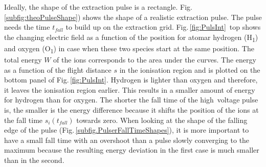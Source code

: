	Ideally, the shape of the extraction pulse is a rectangle. Fig.\,\ref{subfig:theoPulseShape}) shows the shape of a realistic extraction pulse. The pulse needs the time $t_{fall}$ to build up on the extraction grid. Fig.\,\ref{fig:PulsInt}~top shows the changing electric field as a function of the position for atomar hydrogen (H\textsubscript{1}) and oxygen (O\textsubscript{1}) in case when these two species start at the same position. The total energy $W$ of the ions corresponds to the area under the curves. The energy as a function of the flight distance $s$ in the ionisation region and is plotted on the bottom panel of Fig.\,\ref{fig:PulsInt}. Hydrogen is lighter than oxygen and therefore, it leaves the ionisation region earlier. This results in a smaller amount of energy for hydrogen than for oxygen. The shorter the fall time of the high~voltage pulse is, the smaller is the energy difference because it shifts the position of the ions at the fall time $s_i(t_{fall})$ towards zero. When looking at the shape of the falling edge of the pulse (Fig.\,\ref{subfig.PulserFallTimeShapes}), it is more important to have a small fall time with an overshoot than a pulse slowly converging to the maximum because the resulting energy deviation in the first case is much smaller than in the second.\\
	
